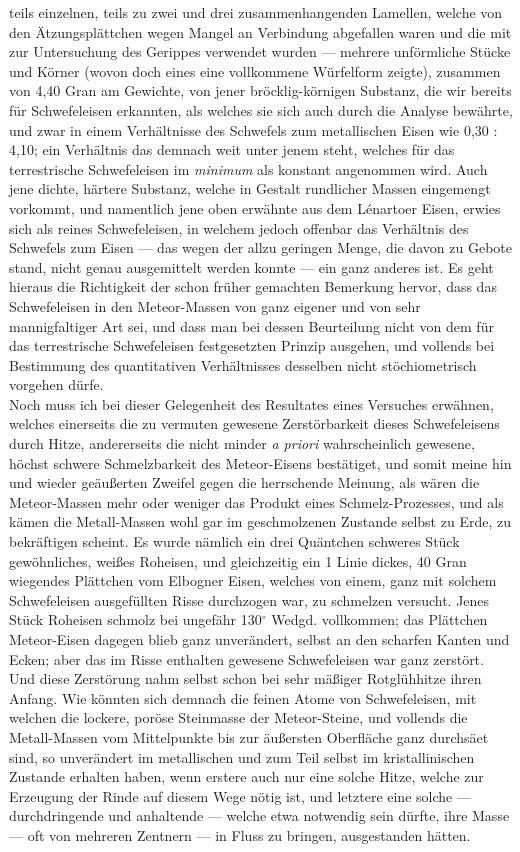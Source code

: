 \documentclass[a4paper, 11pt, oneside, german]{article}
\begin{document}
{teils einzelnen, teils zu zwei und drei zusammenhangenden Lamellen, welche von den Ätzungsplättchen wegen Mangel an Verbindung abgefallen waren und die mit zur Untersuchung des Gerippes verwendet wurden --- mehrere unförmliche Stücke und Körner (wovon doch eines eine vollkommene Würfelform zeigte), zusammen von 4,40 Gran am Gewichte, von jener bröcklig-körnigen Substanz, die wir bereits für Schwefeleisen erkannten, als welches sie sich auch durch die Analyse bewährte, und zwar in einem Verhältnisse des Schwefels zum metallischen Eisen wie 0,30 : 4,10; ein Verhältnis das demnach weit unter jenem steht, welches für das terrestrische Schwefeleisen im \emph{minimum} als konstant angenommen wird. Auch jene dichte, härtere Substanz, welche in Gestalt rundlicher Massen eingemengt vorkommt, und namentlich jene oben erwähnte aus dem Lénartoer Eisen, erwies sich als reines Schwefeleisen, in welchem jedoch offenbar das Verhältnis des Schwefels zum Eisen --- das wegen der allzu geringen Menge, die davon zu Gebote stand, nicht genau ausgemittelt werden konnte --- ein ganz anderes ist. Es geht hieraus die Richtigkeit der schon früher gemachten Bemerkung hervor, dass das Schwefeleisen in den Meteor-Massen von ganz eigener und von sehr mannigfaltiger Art sei, und dass man bei dessen Beurteilung nicht von dem für das terrestrische Schwefeleisen festgesetzten Prinzip ausgehen, und vollends bei Bestimmung des quantitativen Verhältnisses desselben nicht stöchiometrisch vorgehen dürfe.\\
Noch muss ich bei dieser Gelegenheit des Resultates eines Versuches erwähnen, welches einerseits die zu vermuten gewesene Zerstörbarkeit dieses Schwefeleisens durch Hitze, andererseits die nicht minder \emph{a priori} wahrscheinlich gewesene, höchst schwere Schmelzbarkeit des Meteor-Eisens bestätiget, und somit meine hin und wieder geäußerten Zweifel gegen die herrschende Meinung, als wären die Meteor-Massen mehr oder weniger das Produkt eines Schmelz-Prozesses, und als kämen die Metall-Massen wohl gar im geschmolzenen Zustande selbst zu Erde, zu bekräftigen scheint. Es wurde nämlich ein drei Quäntchen schweres Stück gewöhnliches, weißes Roheisen, und gleichzeitig ein 1 Linie dickes, 40 Gran wiegendes Plättchen vom Elbogner Eisen, welches von einem, ganz mit solchem Schwefeleisen ausgefüllten Risse durchzogen war, zu schmelzen versucht. Jenes Stück Roheisen schmolz bei ungefähr 130$^{\circ}$ Wedgd. vollkommen; das Plättchen Meteor-Eisen dagegen blieb ganz unverändert, selbst an den scharfen Kanten und Ecken; aber das im Risse enthalten gewesene Schwefeleisen war ganz zerstört. Und diese Zerstörung nahm selbst schon bei sehr mäßiger Rotglühhitze ihren Anfang. Wie könnten sich demnach die feinen Atome von Schwefeleisen, mit welchen die lockere, poröse Steinmasse der Meteor-Steine, und vollends die Metall-Massen vom Mittelpunkte bis zur äußersten Oberfläche ganz durchsäet sind, so unverändert im metallischen und zum Teil selbst im kristallinischen Zustande erhalten haben, wenn erstere auch nur eine solche Hitze, welche zur Erzeugung der Rinde auf diesem Wege nötig ist, und letztere eine solche --- durchdringende und anhaltende --- welche etwa notwendig sein dürfte, ihre Masse --- oft von mehreren Zentnern --- in Fluss zu bringen, ausgestanden hätten.}
\end{document}
